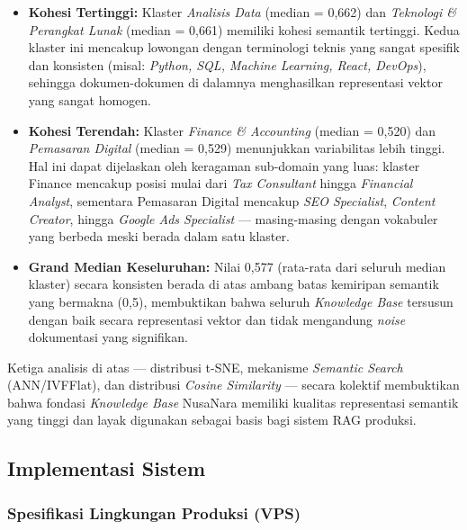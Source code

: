 \begin{itemize}[noitemsep]
  \item \textbf{Kohesi Tertinggi:} Klaster \textit{Analisis Data} (median = 0,662) dan \textit{Teknologi \& Perangkat Lunak} (median = 0,661) memiliki kohesi semantik tertinggi. Kedua klaster ini mencakup lowongan dengan terminologi teknis yang sangat spesifik dan konsisten (misal: \textit{Python, SQL, Machine Learning, React, DevOps}), sehingga dokumen-dokumen di dalamnya menghasilkan representasi vektor yang sangat homogen.
  \item \textbf{Kohesi Terendah:} Klaster \textit{Finance \& Accounting} (median = 0,520) dan \textit{Pemasaran Digital} (median = 0,529) menunjukkan variabilitas lebih tinggi. Hal ini dapat dijelaskan oleh keragaman sub-domain yang luas: klaster Finance mencakup posisi mulai dari \textit{Tax Consultant} hingga \textit{Financial Analyst}, sementara Pemasaran Digital mencakup \textit{SEO Specialist}, \textit{Content Creator}, hingga \textit{Google Ads Specialist} --- masing-masing dengan vokabuler yang berbeda meski berada dalam satu klaster.
  \item \textbf{Grand Median Keseluruhan:} Nilai 0,577 (rata-rata dari seluruh median klaster) secara konsisten berada di atas ambang batas kemiripan semantik yang bermakna (0,5), membuktikan bahwa seluruh \textit{Knowledge Base} tersusun dengan baik secara representasi vektor dan tidak mengandung \textit{noise} dokumentasi yang signifikan.
\end{itemize}

Ketiga analisis di atas --- distribusi t-SNE, mekanisme \textit{Semantic Search} (ANN/IVFFlat), dan distribusi \textit{Cosine Similarity} --- secara kolektif membuktikan bahwa fondasi \textit{Knowledge Base} NusaNara memiliki kualitas representasi semantik yang tinggi dan layak digunakan sebagai basis bagi sistem RAG produksi.



\subsection{Implementasi Sistem}

\subsubsection{Spesifikasi Lingkungan Produksi (VPS)}


